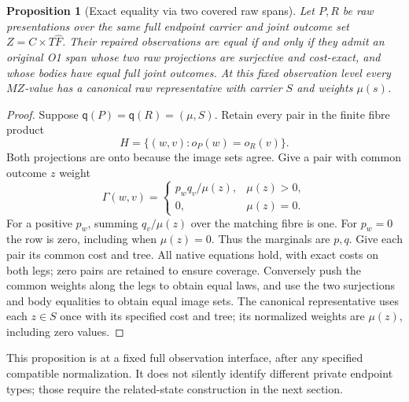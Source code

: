 \documentclass[11pt,a4paper]{article}
\newtheorem{proposition}[theorem]{Proposition}
\theoremstyle{definition}
\newcommand{\qobs}{\mathsf{q}}
\begin{document}
\begin{proposition}[Exact equality via two covered raw spans]
\label{prop:exact-span}
Let $P,R$ be raw presentations over the same full endpoint carrier and
joint outcome set $Z=C\times T\widehat F$. Their repaired observations
are equal if and only if they admit an original O1 span whose two raw
projections are surjective and cost-exact, and whose bodies have equal
full joint outcomes. At this fixed observation level every $MZ$-value
has a canonical raw representative with carrier $S$ and weights $\mu(s)$.
\end{proposition}
\begin{proof}
Suppose $\qobs(P)=\qobs(R)=(\mu,S)$. Retain every pair in the finite fibre
product
\[
 H=\{(w,v):o_P(w)=o_R(v)\}.
\]
Both projections are onto because the image sets agree. Give a pair
with common outcome $z$ weight
\[
 \Gamma(w,v)=
 \begin{cases}p_wq_v/\mu(z),&\mu(z)>0,\\0,&\mu(z)=0.\end{cases}
\]
For a positive $p_w$, summing $q_v/\mu(z)$ over the matching fibre
is one. For $p_w=0$ the row is zero, including when $\mu(z)=0$.
Thus the marginals are $p,q$. Give each pair its common cost and tree.
All native equations hold, with exact costs on both legs; zero pairs
are retained to ensure coverage. Conversely push the common weights
along the legs to obtain equal laws, and use the two surjections and
body equalities to obtain equal image sets. The canonical representative
uses each $z\in S$ once with its specified cost and tree; its normalized
weights are $\mu(z)$, including zero values.
\end{proof}
This proposition is at a fixed full observation interface, after any
specified compatible normalization. It does not silently identify
different private endpoint types; those require the related-state
construction in the next section.
\end{document}
